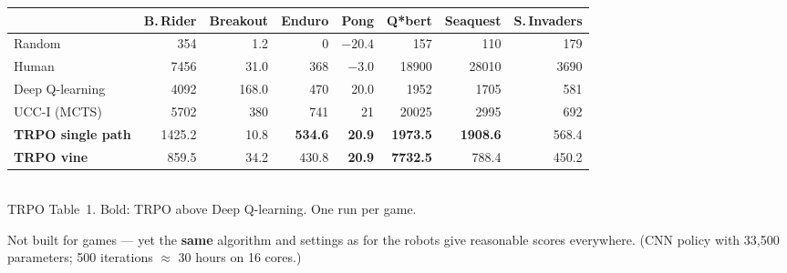 \begin{center}
\footnotesize
\setlength{\tabcolsep}{5pt}
\begin{tabular}{l r r r r r r r}
\toprule
 & B.\,Rider & Breakout & Enduro & Pong & Q*bert & Seaquest & S.\,Invaders \\
\midrule
{\color{NoteGray}Random} & {\color{NoteGray}354} & {\color{NoteGray}1.2} & {\color{NoteGray}0} & {\color{NoteGray}$-20.4$} & {\color{NoteGray}157} & {\color{NoteGray}110} & {\color{NoteGray}179} \\
{\color{NoteGray}Human} & {\color{NoteGray}7456} & {\color{NoteGray}31.0} & {\color{NoteGray}368} & {\color{NoteGray}$-3.0$} & {\color{NoteGray}18900} & {\color{NoteGray}28010} & {\color{NoteGray}3690} \\
Deep Q-learning & 4092 & 168.0 & 470 & 20.0 & 1952 & 1705 & 581 \\
UCC-I (MCTS) & 5702 & 380 & 741 & 21 & 20025 & 2995 & 692 \\
\midrule
{\color{AtlasCool}\textbf{TRPO single path}} & 1425.2 & 10.8 & \textbf{534.6} & \textbf{20.9} & \textbf{1973.5} & \textbf{1908.6} & 568.4 \\
{\color{AtlasCool}\textbf{TRPO vine}} & 859.5 & 34.2 & 430.8 & \textbf{20.9} & \textbf{7732.5} & 788.4 & 450.2 \\
\bottomrule
\end{tabular}\\[2pt]
{\scriptsize\color{NoteGray}TRPO Table~1. Bold: TRPO above Deep Q-learning. One run per game.}
\end{center}

\begin{keybox}
Not built for games --- yet the \textbf{same} algorithm and settings as for the robots give reasonable scores everywhere. (CNN policy with 33{,}500 parameters; 500 iterations $\approx$ 30 hours on 16 cores.)
\end{keybox}
